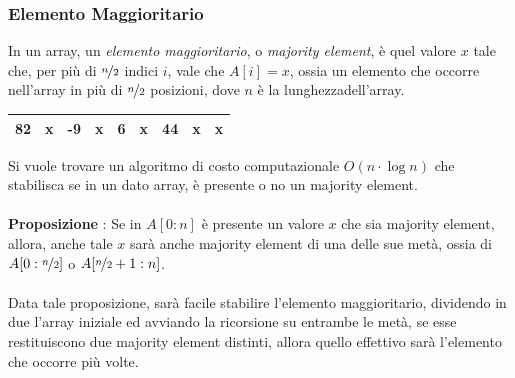 \documentclass[12pt, letterpaper]{article}
\newcommand{\acc}{\\\hphantom{}\\}
\begin{document}
\subsubsection{Elemento Maggioritario}
In un array, un \textit{elemento maggioritario}, o \textit{majority element}, è quel valore $x$ tale che,
per più di $\nicefrac{n}{2}$ indici $i$, vale che $A[i]=x$, ossia un elemento che occorre nell'array in più di
$\nicefrac{n}{2}$ posizioni, dove $n$ è la lunghezzadell'array.
\begin{center}
    \begin{tabular}{|c|c|c|c|c|c|c|c|c|}
        \hline
        82 & x & -9 & x & 6 & x & 44 & x & x \\ \hline
    \end{tabular}
\end{center}
Si vuole trovare un algoritmo di costo computazionale $O(n\cdot\log{n})$ che stabilisca se in un dato array, è
presente o no un majority element.\acc
\textbf{Proposizione} : Se in $A[0:n]$ è presente un valore $x$ che sia majority element, allora, anche tale $x$ sarà
anche majority element di una delle sue metà, ossia di $A[0:\nicefrac{n}{2}]$ o $A[\nicefrac{n}{2}+1:n]$.\acc
Data tale proposizione, sarà facile stabilire l'elemento maggioritario, dividendo in due l'array iniziale ed avviando la ricorsione
su entrambe le metà, se esse restituiscono due majority element distinti, allora quello effettivo sarà l'elemento che occorre più volte.
\end{document}
